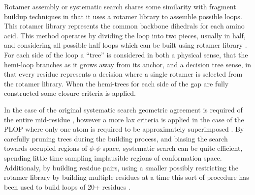 Rotamer assembly or systematic search shares some similarity with fragment buildup techniques in that it uses a rotamer library to assemble possible loops.
This rotamer library represents the common backbone dihedrals for each amino acid.
This method operates by dividing the loop into two pieces, usually in half, and considering all possible half loops which can be built using rotamer library \cite{moult1986algorithm}.
For each side of the loop a ``tree'' is considered in both a physical sense, that the hemi-loop branches as it grows away from its anchor, and a decision tree sense, in that every residue represents a decision where a single rotamer is selected from the rotamer library.
When the hemi-trees for each side of the gap are fully constructed some closure criteria is applied.

In the case of the original systematic search geometric agreement is required of the entire mid-residue \cite{moult1986algorithm}, however a more lax criteria is applied in the case of the PLOP where only one atom is required to be approximately superimposed \cite{jacobson2004hierarchical}.
By carefully pruning trees during the building process, and biasing the search towards occupied regions of $\phi$-$\psi$ space, systematic search can be quite efficient, spending little time sampling implausible regions of conformation space.
Additionaly, by building residue pairs, using a smaller
 possibly restricting the rotamer library by building multiple residues at a time this sort of procedure has been used to build loops of 20+ residues \cite{zhao2011progress}.
